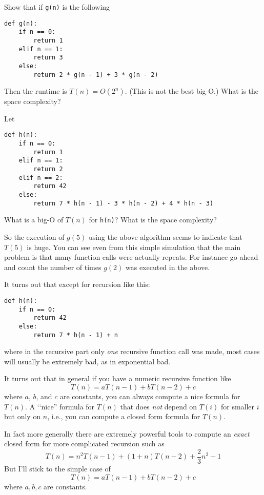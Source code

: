 \begin{ex}
  Show that if \verb!g(n)! is the following
\begin{Verbatim}[frame=single,fontsize=\footnotesize]
def g(n):
    if n == 0: 
        return 1
    elif n == 1:
        return 3
    else:
        return 2 * g(n - 1) + 3 * g(n - 2)
\end{Verbatim}
Then the runtime is $T(n) = O(2^n)$. (This is not the best big-O.)
What is the space complexity?
\end{ex}

\begin{ex}
  Let
\begin{Verbatim}[frame=single,fontsize=\footnotesize]
def h(n):
    if n == 0: 
        return 1
    elif n == 1:
        return 2
    elif n == 2:
        return 42
    else:
        return 7 * h(n - 1) - 3 * h(n - 2) + 4 * h(n - 3)
\end{Verbatim}
What is a big-O of $T(n)$ for \verb!h(n)!?
What is the space complexity?
\end{ex}


So the execution of $g(5)$ using the above algorithm
seems to indicate that $T(5)$ is huge.
You can see even from this simple simulation that the main
problem is that many function calls were actually repeats.
For instance go ahead and count the number of times
$g(2)$ was executed in the above.

It turns out that except for recursion like this:
\begin{Verbatim}[frame=single,fontsize=\footnotesize]
def h(n):
    if n == 0:
        return 42
    else:
        return 7 * h(n - 1) + n
\end{Verbatim}
where in the recursive part only \textit{one} recursive function call was made,
most cases will usually be extremely bad, as in exponential bad.

It turns out that in general if you have a numeric recursive function
like
\[
T(n) = aT(n - 1) + bT(n - 2) + c
\]
where $a$, $b$, and $c$ are constants,
you can always compute a nice formula for $T(n)$.
A \lq\lq nice'' formula for $T(n)$ that does \textit{not} depend on 
$T(i)$ for smaller $i$ but only on $n$, i.e.,
you can compute a closed form formula for $T(n)$.

In fact more generally there are extremely powerful 
tools to compute an \textit{exact} closed form for more complicated
recursion such as 
\[
T(n) = n^2 T(n-1) + (1 + n) T(n - 2) + \frac{2}{3}n^2 - 1 
\]
But I'll stick to the simple case of
\[
T(n) = aT(n - 1) + bT(n - 2) + c
\]
where $a,b,c$ are constants.

